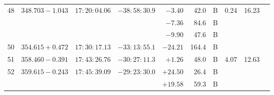 {\begin{longtable}{l lll r r c rrr}
48   &  $348.703-1.043$   &  $17:20:04.06$    & $-38:58:30.9$    & $  -3.40 $ &    42.0&       B    &    0.24  &   16.23   &           \\
     &  $             $   &  $           $    & $           $    & $  -7.36 $ &    84.6&       B    &          &           &           \\
     &  $             $   &  $           $    & $           $    & $  -9.90 $ &    47.6&       B    &          &           &           \\
50   &  $354.615+0.472$   &  $17:30:17.13$    & $-33:13:55.1$    & $ -24.21 $ &   164.4&       B    &          &           &           \\
51   &  $358.460-0.391$   &  $17:43:26.76$    & $-30:27:11.3$    & $  +1.26 $ &    48.0&       B    &    4.07  &   12.63   &           \\
52   &  $359.615-0.243$   &  $17:45:39.09$    & $-29:23:30.0$    & $ +24.50 $ &    26.4&       B    &          &           &           \\
     &  $             $   &  $           $    & $           $    & $ +19.58 $ &    59.3&       B    &          &           &           \\
    \end{longtable}}

